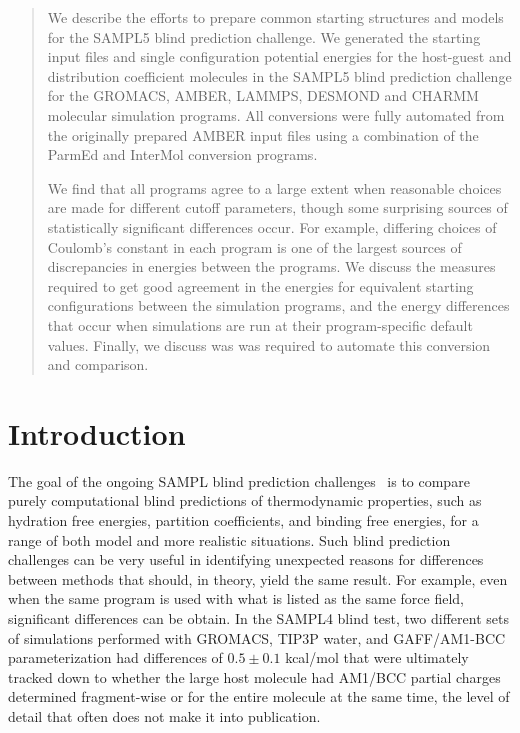 %
\begin{abstract}

We describe the efforts to prepare common starting structures and
models for the SAMPL5 blind prediction challenge. We generated the
starting input files and single configuration potential energies for
the host-guest and distribution coefficient molecules in the SAMPL5
blind prediction challenge for the GROMACS, AMBER, LAMMPS, DESMOND and
CHARMM molecular simulation programs. All conversions were fully
automated from the originally prepared AMBER input files using a
combination of the ParmEd and InterMol conversion programs.

We find that all programs agree to a large extent when reasonable
choices are made for different cutoff parameters, though some
surprising sources of statistically significant differences occur. For
example, differing choices of Coulomb's constant in each program is
one of the largest sources of discrepancies in energies between the
programs. We discuss the measures required to get good agreement in
the energies for equivalent starting configurations between the
simulation programs, and the energy differences that occur when
simulations are run at their program-specific default values. Finally,
we discuss was was required to automate this conversion and
comparison.

\end{abstract}

\newpage
\section*{Introduction}
\label{intro}

The goal of the ongoing SAMPL blind prediction
challenges~\citep{Muddana2014SAMPL4,Muddana2012a,geballe_sampl2_2010,guthrie_blind_2009}
is to compare purely computational blind predictions of thermodynamic
properties, such as hydration free energies, partition coefficients,
and binding free energies, for a range of both model and more realistic
situations. Such blind prediction challenges can be very useful in
identifying unexpected reasons for differences between methods that
should, in theory, yield the same result. For example, even when the
same program is used with what is listed as the same force field,
significant differences can be obtain. In the SAMPL4 blind test, two
different sets of simulations performed with GROMACS, TIP3P water, and
GAFF/AM1-BCC parameterization had differences of $0.5 \pm 0.1$
kcal/mol that were ultimately tracked down to whether the large host
molecule had AM1/BCC partial charges determined fragment-wise or for
the entire molecule at the same time, the level of detail that often
does not make it into publication.~\cite{Monroe2014}

